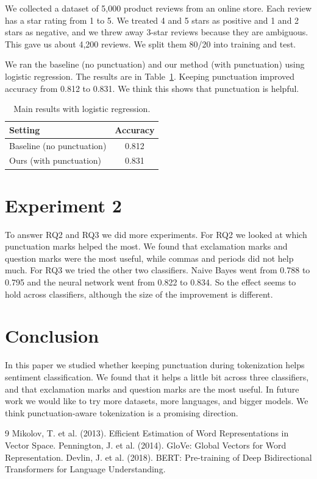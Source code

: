 \documentclass[11pt]{article}
\begin{document}
We collected a dataset of 5,000 product reviews from an online store. Each
review has a star rating from 1 to 5. We treated 4 and 5 stars as positive and
1 and 2 stars as negative, and we threw away 3-star reviews because they are
ambiguous. This gave us about 4,200 reviews. We split them 80/20 into training
and test.

We ran the baseline (no punctuation) and our method (with punctuation) using
logistic regression. The results are in Table~\ref{tab:main}. Keeping
punctuation improved accuracy from 0.812 to 0.831. We think this shows that
punctuation is helpful.

\begin{table}[t]
    \centering
    \begin{tabular}{lc}
        \toprule
        Setting & Accuracy \\
        \midrule
        Baseline (no punctuation) & 0.812 \\
        Ours (with punctuation) & 0.831 \\
        \bottomrule
    \end{tabular}
    \caption{Main results with logistic regression.}
    \label{tab:main}
\end{table}

\section{Experiment 2}

To answer RQ2 and RQ3 we did more experiments. For RQ2 we looked at which
punctuation marks helped the most. We found that exclamation marks and question
marks were the most useful, while commas and periods did not help much. For RQ3
we tried the other two classifiers. Naive Bayes went from 0.788 to 0.795 and the
neural network went from 0.822 to 0.834. So the effect seems to hold across
classifiers, although the size of the improvement is different.

\section{Conclusion}

In this paper we studied whether keeping punctuation during tokenization helps
sentiment classification. We found that it helps a little bit across three
classifiers, and that exclamation marks and question marks are the most useful.
In future work we would like to try more datasets, more languages, and bigger
models. We think punctuation-aware tokenization is a promising direction.

\begin{thebibliography}{9}
 Mikolov, T. et al. (2013). Efficient Estimation of Word Representations in Vector Space.
 Pennington, J. et al. (2014). GloVe: Global Vectors for Word Representation.
 Devlin, J. et al. (2018). BERT: Pre-training of Deep Bidirectional Transformers for Language Understanding.
\end{thebibliography}
\end{document}
